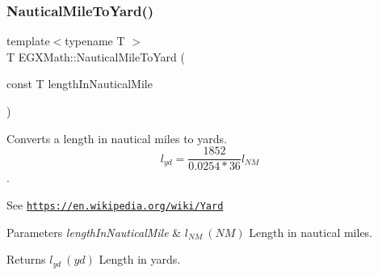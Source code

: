 \subsubsection{\texorpdfstring{Nautical\+Mile\+To\+Yard()}{NauticalMileToYard()}}
{\footnotesize\ttfamily template$<$typename T $>$ \\
T E\+G\+X\+Math\+::\+Nautical\+Mile\+To\+Yard (\begin{DoxyParamCaption}\item[{const T}]{length\+In\+Nautical\+Mile }\end{DoxyParamCaption})}



Converts a length in nautical miles to yards. \[ l_{yd}= \frac{1852}{0.0254 * 36}l_{NM} \]. 

See \href{https://en.wikipedia.org/wiki/Yard}{\tt https\+://en.\+wikipedia.\+org/wiki/\+Yard} 
\begin{DoxyParams}{Parameters}
{\em length\+In\+Nautical\+Mile} & $ l_{NM}\ (NM)$ Length in nautical miles. \\
\hline
\end{DoxyParams}
\begin{DoxyReturn}{Returns}
$ l_{yd}\ (yd)$ Length in yards. 
\end{DoxyReturn}
